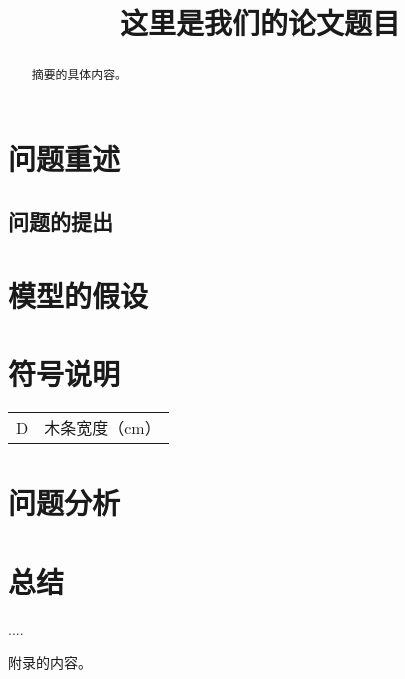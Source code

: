 \documentclass{cumcmthesis}
\title{这里是我们的论文题目}
\begin{document}
 \maketitle
 
 \begin{abstract}
 	摘要的具体内容。
 \end{abstract}
\tableofcontents
\newpage
\section{问题重述}
\subsection{问题的提出}
\section{模型的假设}
\section{符号说明}
\begin{center}
	\begin{tabular}{cc}
		\hline
		\makebox[0.3\textwidth][c]{符号}	&  \makebox[0.4\textwidth][c]{意义} \\ \hline
		D	    & 木条宽度（cm） \\ \hline
	\end{tabular}
\end{center}
\section{问题分析}
\section{总结}
\begin{thebibliography}{9}%
	 ....
\end{thebibliography}

\begin{appendices}
	附录的内容。
\end{appendices}
\end{document}
